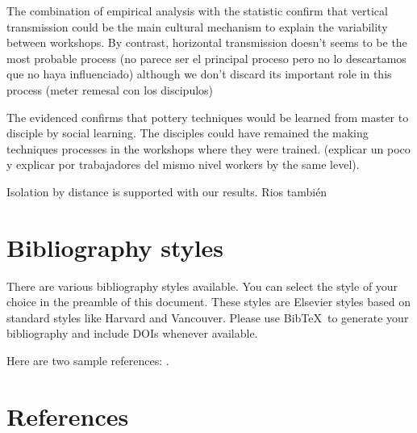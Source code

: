 \documentclass[review]{elsarticle}
\begin{document}
The combination of empirical analysis with the statistic confirm that vertical transmission could be the main cultural mechanism to explain the variability between workshops. By contrast, horizontal transmission doesn't seems to be the most probable process (no parece ser el principal proceso pero no lo descartamos que no haya influenciado) although we don't discard its important role in this process (meter remesal con los discipulos)

The evidenced confirms that pottery techniques would be learned from master to disciple by social learning. The disciples could have remained the making techniques processes in the workshops where they were trained. (explicar un poco y explicar por trabajadores del mismo nivel workers by the same level).


Isolation by distance is supported with our results. 
Rios también



\section{Bibliography styles}

There are various bibliography styles available. You can select the style of your choice in the preamble of this document. These styles are Elsevier styles based on standard styles like Harvard and Vancouver. Please use Bib\TeX\ to generate your bibliography and include DOIs whenever available.

Here are two sample references: \cite{Feynman1963118,Dirac1953888}.

\section*{References}


\end{document}
